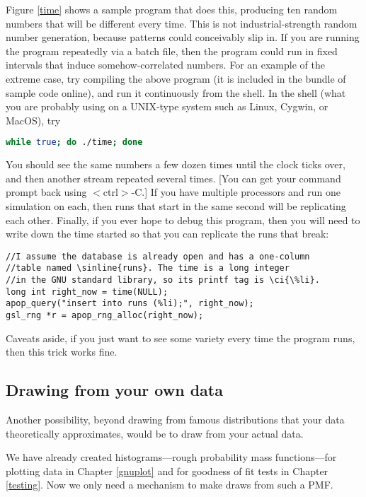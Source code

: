 Figure \ref{time} shows a sample program that
does this, producing ten random numbers that will be different every
time.  This is not industrial-strength random number generation, because
patterns could conceivably slip in. If you are running the program repeatedly  
via a batch file, then the program could run in fixed
intervals that induce somehow-correlated numbers. For an example of the extreme case, try
compiling the above program (it is included in the bundle of sample
code online), and run it continuously from the shell. In the 
shell
(what you are probably using on a UNIX-type system such as Linux, Cygwin, or MacOS), try
\begin{lstlisting}[language=bash]
while true; do ./time; done
\end{lstlisting}
You should see the same numbers a few dozen times until the clock ticks
over, and then another stream repeated several times.  [You can get your
command prompt back using $<$ctrl$>$-C.] If you have multiple processors
and run one simulation on each, then runs that start in the same second
will be replicating each other. Finally, if you ever hope to debug this
program, then you will need to write down the time started so that you
can replicate the runs that break: 
\begin{lstlisting}[texcl=true]
//I assume the database is already open and has a one-column
//table named \sinline{runs}. The time is a long integer
//in the GNU standard library, so its printf tag is \ci{\%li}.
long int right_now = time(NULL);
apop_query("insert into runs (%li);", right_now);
gsl_rng *r = apop_rng_alloc(right_now);
\end{lstlisting}
Caveats aside, if you just want
to see some variety every time the program runs, then this trick
works fine.



\subsection{Drawing from your own data} 
Another possibility, beyond drawing from famous distributions that your
data theoretically approximates, would be to draw from your actual data.

We have already created histograms---rough probability mass
functions---for plotting data in Chapter \ref{gnuplot} and for goodness
of fit tests in Chapter \ref{testing}. Now we only need a mechanism to
make draws from such a PMF.


